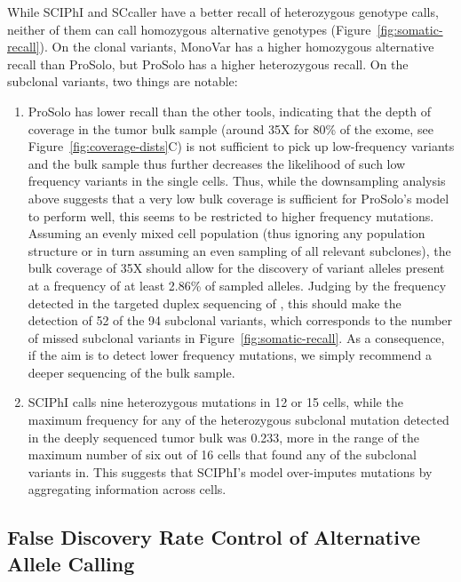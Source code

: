 \documentclass[authoryear,preprint,11pt]{scrartcl}
\begin{document}
While SCIPhI and SCcaller have a better recall of heterozygous genotype calls, neither of them can call homozygous alternative genotypes (Figure~\ref{fig:somatic-recall}).
On the clonal variants, MonoVar has a higher homozygous alternative recall than ProSolo, but ProSolo has a higher heterozygous recall.
On the subclonal variants, two things are notable:
\begin{enumerate}
  \item ProSolo has lower recall than the other tools, indicating that the depth of coverage in the tumor bulk sample (around 35X for 80\% of the exome, see Figure~\ref{fig:coverage-dists}C) is not sufficient to pick up low-frequency variants and the bulk sample thus further decreases the likelihood of such low frequency variants in the single cells.
  Thus, while the downsampling analysis above suggests that a very low bulk coverage is sufficient for ProSolo's model to perform well, this seems to be restricted to higher frequency mutations.
  Assuming an evenly mixed cell population (thus ignoring any population structure or in turn assuming an even sampling of all relevant subclones), the bulk coverage of 35X should allow for the discovery of variant alleles present at a frequency of at least 2.86\% of sampled alleles.
  Judging by the frequency detected in the targeted duplex sequencing of \cite{wang_clonal_2014}, this should make the detection of 52 of the 94 subclonal variants, which corresponds to the number of missed subclonal variants in Figure~\ref{fig:somatic-recall}.
  As a consequence, if the aim is to detect lower frequency mutations, we simply recommend a deeper sequencing of the bulk sample.
  \item SCIPhI calls nine heterozygous mutations in 12 or 15 cells, while the maximum frequency for any of the heterozygous subclonal mutation detected in the deeply sequenced tumor bulk was 0.233, more in the range of the maximum number of six out of 16 cells that \cite{wang_clonal_2014} found any of the subclonal variants in.
  This suggests that SCIPhI's model over-imputes mutations by aggregating information across cells.
\end{enumerate}

\subsection{False Discovery Rate Control of Alternative Allele Calling} \label{sec:fdr-of-alt-calling}
\end{document}
